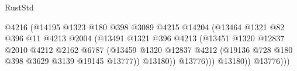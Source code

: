 \begin{lexlean}{RustStd}
\begin{coremodule}
                                                  @4216
                                                  (@14195
                                                    @1323
                                                    @180
                                                    @398
                                                    @3089
                                                    @4215
                                                    @14204
                                                    (@13464
                                                      @1321
                                                      @82
                                                      @396
                                                      @11
                                                      @4213
                                                      @2004
                                                      (@13491
                                                        @1321
                                                        @396
                                                        @4213
                                                        (@13451
                                                          @1320
                                                          @12837
                                                          @2010
                                                          @4212
                                                          @2162
                                                          @6787
                                                          (@13459
                                                            @1320
                                                            @12837
                                                            @4212
                                                            (@19136
                                                              @728
                                                              @180
                                                              @398
                                                              @3629
                                                              @3139
                                                              @19145
                                                              @13777))
                                                          @13180))
                                                      @13776)))
                                                @13180))
                                            @13776)))

\end{coremodule}
\end{lexlean}
